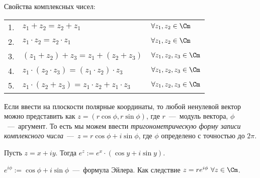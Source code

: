 Свойства комплексных чисел:
\begin{tabular}{cll}
1. & $z_{1} + z_{2} = z_{2} + z_{1}$ & $\forall z_{1}, z_{2} \in \Cm$ \\
2. & $z_{1} \cdot z_{2} = z_{2} \cdot z_{1}$ & $\forall z_{1}, z_{2} \in \Cm$ \\
3. & $(z_{1} + z_{2}) + z_{3} = z_{1} + (z_{2} + z_{3})$ & $\forall z_{1}, z_{2}, z_{3} \in \Cm$ \\
4. & $z_{1} \cdot (z_{2} \cdot z_{3}) = (z_{1} \cdot z_{2}) \cdot z_{3}$ & $\forall z_{1}, z_{2}, z_{3} \in \Cm$ \\
5. & $z_{1} \cdot (z_{2} + z_{3}) = z_{1} \cdot z_{2} + z_{1} \cdot z_{3}$ & $\forall z_{1}, z_{2}, z_{3} \in \Cm$ 
\end{tabular}

Если ввести на плоскости полярные координаты, то любой ненулевой вектор можно представить как $z = (r \cos{\phi}, r \sin{\phi})$, где $r$~---~модуль вектора, $\phi$~---~аргумент. То есть мы можем ввести \textit{тригонометрическую форму записи комплексного числа}~---~$z = r\cos{\phi} + i \sin{\phi}$, где $\phi$ определено с точностью до $2\pi$.

\begin{definition}
    Пусть $z = x + iy$. Тогда $e^{z} := e^{x} \cdot (\cos{y} + i \sin{y})$.
\end{definition}
\begin{corollary}
    $e^{i \phi} := \cos{\phi} + i \sin{\phi}$~---~формула Эйлера. Как следствие $z = r e^{i \phi} \  \forall z \in \Cm$.
\end{corollary}

